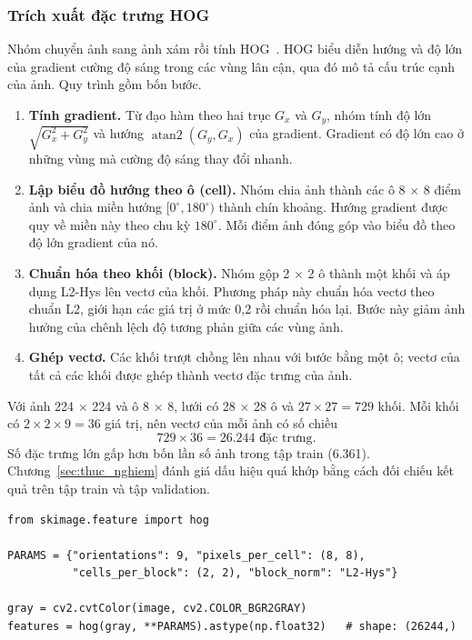 \subsubsection{Trích xuất đặc trưng HOG}

Nhóm chuyển ảnh sang ảnh xám rồi tính HOG~\cite{dalal2005hog}. HOG biểu diễn hướng và độ lớn của gradient cường độ sáng trong các vùng lân cận, qua đó mô tả cấu trúc cạnh của ảnh. Quy trình gồm bốn bước.

\begin{enumerate}
  \item \textbf{Tính gradient.} Từ đạo hàm theo hai trục $G_x$ và $G_y$, nhóm tính độ lớn $\sqrt{G_x^2 + G_y^2}$ và hướng $\operatorname{atan2}(G_y,G_x)$ của gradient. Gradient có độ lớn cao ở những vùng mà cường độ sáng thay đổi nhanh.
  \item \textbf{Lập biểu đồ hướng theo ô (cell).} Nhóm chia ảnh thành các ô 8 $\times$ 8 điểm ảnh và chia miền hướng $[0^\circ,180^\circ)$ thành chín khoảng. Hướng gradient được quy về miền này theo chu kỳ $180^\circ$. Mỗi điểm ảnh đóng góp vào biểu đồ theo độ lớn gradient của nó.
  \item \textbf{Chuẩn hóa theo khối (block).} Nhóm gộp 2 $\times$ 2 ô thành một khối và áp dụng L2-Hys lên vectơ của khối. Phương pháp này chuẩn hóa vectơ theo chuẩn L2, giới hạn các giá trị ở mức 0,2 rồi chuẩn hóa lại. Bước này giảm ảnh hưởng của chênh lệch độ tương phản giữa các vùng ảnh.
  \item \textbf{Ghép vectơ.} Các khối trượt chồng lên nhau với bước bằng một ô; vectơ của tất cả các khối được ghép thành vectơ đặc trưng của ảnh.
\end{enumerate}

Với ảnh 224 $\times$ 224 và ô 8 $\times$ 8, lưới có 28 $\times$ 28 ô và $27 \times 27 = 729$ khối. Mỗi khối có $2 \times 2 \times 9 = 36$ giá trị, nên vectơ của mỗi ảnh có số chiều
\[
  729 \times 36 = 26.244 \text{ đặc trưng}.
\]
Số đặc trưng lớn gấp hơn bốn lần số ảnh trong tập train (6.361). Chương~\ref{sec:thuc_nghiem} đánh giá dấu hiệu quá khớp bằng cách đối chiếu kết quả trên tập train và tập validation.

\begin{lstlisting}[caption={Cấu hình trích xuất HOG},label={lst:hog}]
from skimage.feature import hog

PARAMS = {"orientations": 9, "pixels_per_cell": (8, 8),
          "cells_per_block": (2, 2), "block_norm": "L2-Hys"}

gray = cv2.cvtColor(image, cv2.COLOR_BGR2GRAY)
features = hog(gray, **PARAMS).astype(np.float32)   # shape: (26244,)
\end{lstlisting}

